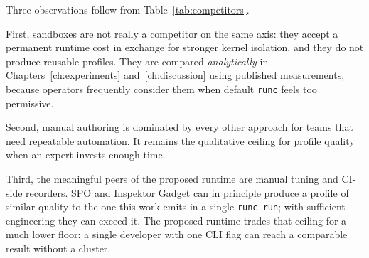 \begin{table}[ht]
\centering
\caption{Approaches to container confinement and the operational cost they impose.}
\label{tab:competitors}
\end{table}

Three observations follow from Table~\ref{tab:competitors}.

First, sandboxes are not really a competitor on the same axis: they accept a permanent runtime cost in exchange for stronger kernel isolation, and they do not produce reusable profiles. They are compared \emph{analytically} in Chapters~\ref{ch:experiments} and~\ref{ch:discussion} using published measurements, because operators frequently consider them when default \texttt{runc} feels too permissive.

Second, manual authoring is dominated by every other approach for teams that need repeatable automation. It remains the qualitative ceiling for profile quality when an expert invests enough time.

Third, the meaningful peers of the proposed runtime are manual tuning and CI-side recorders. SPO and Inspektor Gadget can in principle produce a profile of similar quality to the one this work emits in a single \texttt{runc run}; with sufficient engineering they can exceed it. The proposed runtime trades that ceiling for a much lower floor: a single developer with one CLI flag can reach a comparable result without a cluster.

